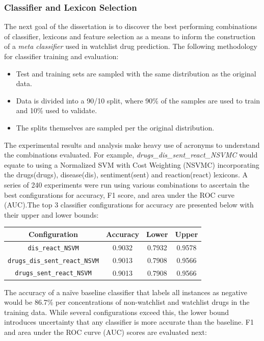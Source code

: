 \documentclass[twoside,11pt]{article}
\begin{document}
\subsubsection{Classifier and Lexicon Selection}
The next goal of the dissertation is to discover the best performing combinations of classifier, lexicons and feature selection as a means to inform the construction of a \textit{meta classifier} used in watchlist drug prediction. The following methodology for classifier
training and evaluation:
\begin{itemize}
  \item Test and training sets are sampled with the same distribution as the original data.
  \item Data is divided into a 90/10 split, where 90\% of the samples are used to train and 10\% used to validate.
  \item The splits themselves are sampled per the original distribution.
\end{itemize}
The experimental results and analysis make heavy use of acronyms to understand the combinations evaluated. For example, \textit{drugs\_dis\_sent\_react\_NSVMC} would equate to using a Normalized SVM with Cost Weighting (NSVMC) incorporating the drugs(drugs), disease(dis), sentiment(sent) and reaction(react) lexicons. A series of 240 experiments were run using various combinations to ascertain the best configurations for accuracy, F1 score, and area under the ROC curve (AUC).The top 3 classifier configurations for accuracy are presented below with their upper and lower bounds:
\begin{center}
  \begin{tabular}{||c c c c||}
    \hline
    Configuration & Accuracy & Lower & Upper \\
    \hline\hline
    \verb|dis_react_NSVM| & 0.9032 & 0.7932 & 0.9578 \\
    \hline
    \verb|drugs_dis_sent_react_NSVM| & 0.9013 & 0.7908 & 0.9566 \\
    \hline
    \verb|drugs_sent_react_NSVM| & 0.9013 & 0.7908 & 0.9566 \\
    \hline
  \end{tabular}
\end{center}
The accuracy of a na\"ive baseline classifier that labels all instances as negative would be 86.7\% per concentrations of non-watchlist and watchlist drugs in the training data. While several configurations exceed this, the lower bound introduces uncertainty that any classifier is more accurate than the baseline. F1 and area under the ROC curve (AUC) scores are evaluated next:
\end{document}
